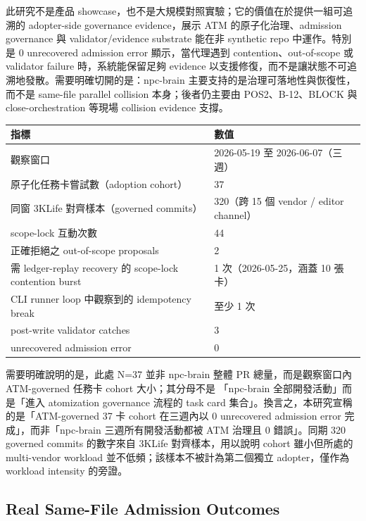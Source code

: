 \documentclass[a4paper,fontset=none]{ctexart}
\begin{document}
此研究不是產品 showcase，也不是大規模對照實驗；它的價值在於提供一組可追溯的 adopter-side governance evidence，展示 ATM 的原子化治理、admission governance 與 validator/evidence substrate 能在非 synthetic repo 中運作。特別是 0 unrecovered admission error 顯示，當代理遇到 contention、out-of-scope 或 validator failure 時，系統能保留足夠 evidence 以支援修復，而不是讓狀態不可追溯地發散。需要明確切開的是：npc-brain 主要支持的是治理可落地性與恢復性，而不是 same-file parallel collision 本身；後者仍主要由 POS2、B-12、BLOCK 與 close-orchestration 等現場 collision evidence 支撐。

\smallskip{}\par\smallskip

\begingroup
\footnotesize
{}
\begin{longtable}{L{0.28\textwidth}L{0.28\textwidth}}
\toprule
指標 & 數值 \\
\midrule
觀察窗口 & 2026-05-19 至 2026-06-07（三週） \\
原子化任務卡嘗試數（adoption cohort） & 37 \\
同窗 3KLife 對齊樣本（governed commits） & 320（跨 15 個 vendor / editor channel） \\
scope-lock 互動次數 & 44 \\
正確拒絕之 out-of-scope proposals & 2 \\
需 ledger-replay recovery 的 scope-lock contention burst & 1 次（2026-05-25，涵蓋 10 張卡） \\
CLI runner loop 中觀察到的 idempotency break & 至少 1 次 \\
post-write validator catches & 3 \\
unrecovered admission error & 0 \\
\bottomrule
\end{longtable}
\endgroup

需要明確說明的是，此處 N=37 並非 npc-brain 整體 PR 總量，而是觀察窗口內 ATM-governed 任務卡 cohort 大小；其分母不是 「npc-brain 全部開發活動」而是「進入 atomization governance 流程的 task card 集合」。換言之，本研究宣稱的是「ATM-governed 37 卡 cohort 在三週內以 0 unrecovered admission error 完成」，而非「npc-brain 三週所有開發活動都被 ATM 治理且 0 錯誤」。同期 320 governed commits 的數字來自 3KLife 對齊樣本，用以說明 cohort 雖小但所處的 multi-vendor workload 並不低頻；該樣本不被計為第二個獨立 adopter，僅作為 workload intensity 的旁證。

\subsection{Real Same-File Admission Outcomes}
\end{document}
